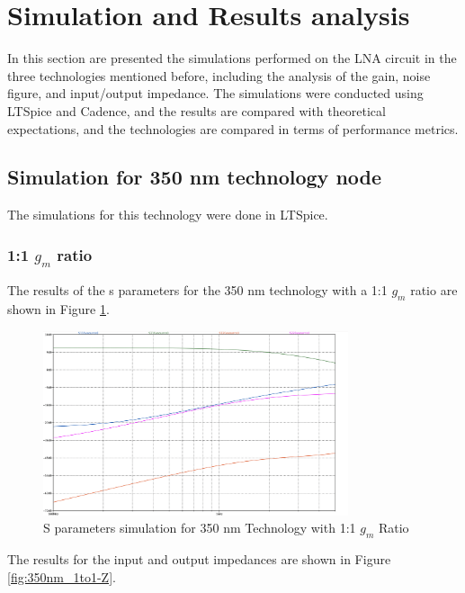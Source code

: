 \section{Simulation and Results analysis}

In this section are presented the simulations performed on the LNA circuit in the three technologies mentioned before, including the analysis of the gain, noise figure, and input/output impedance. The simulations were conducted using LTSpice and Cadence, and the results are compared with theoretical expectations, and the technologies are compared in terms of performance metrics.

\subsection{Simulation for 350 nm technology node}

The simulations for this technology were done in LTSpice.
\subsubsection{1:1 $g_m$ ratio}

The results of the s parameters for the 350 nm technology with a 1:1 $g_m$ ratio are shown in Figure \ref{fig:350nm_1to1}. 
\begin{figure}[H]
    \centering
    \includegraphics[width=0.8\textwidth]{Images/3501to1SParam.png}
    \caption{S parameters simulation for 350 nm Technology with 1:1 $g_m$ Ratio}
    \label{fig:350nm_1to1}
\end{figure}

The results for the input and output impedances are shown in Figure \ref{fig:350nm_1to1-Z}.

